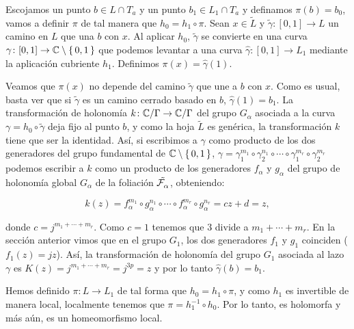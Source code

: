 Escojamos un punto $b\in L\cap T_{a}$ y un punto $b_{1}\in L_{1}\cap T_{a}$ y definamos $\pi(b)=b_{0}$, vamos a definir $\pi$ de tal manera que $h_{0}=h_{1}\circ\pi$. Sean $x\in\tilde{L}$ y $\tilde{\gamma}\colon [0,1]\rightarrow L$ un camino en $L$ que una $b$ con $x$. Al aplicar $h_{0}$, $\tilde{\gamma}$ se convierte en una curva $\gamma\colon [0,1]\rightarrow\mathbb{C}\setminus\{\, 0,1\, \}$ que podemos levantar a una curva $\hat{\gamma}\colon [0,1]\rightarrow  L_{1}$ mediante la aplicación cubriente $h_{1}$. Definimos $\pi(x)=\hat{\gamma}(1)$.

Veamos que $\pi(x)$ no depende del camino $\tilde{\gamma}$ que une a $b$ con $x$. Como es usual, basta ver que si $\tilde{\gamma}$ es un camino cerrado basado en $b$, $\hat{\gamma}(1)=b_{1}$. La transformación de holonomía $k\colon\mathbb{C}/\Gamma\rightarrow\mathbb{C}/\Gamma$ del grupo $G_{\alpha}$ asociada a la curva $\gamma=h_{0}\circ\tilde{\gamma}$ deja fijo al punto $b$, y como la hoja $\tilde{L}$ es genérica, la transformación $k$ tiene que ser la identidad. Así, si escribimos a $\gamma$ como producto de los dos generadores del grupo fundamental de $\mathbb{C}\setminus\{\, 0,1\, \}$, $\gamma=\gamma_{1}^{m_{1}}\circ\gamma_{2}^{n_{1}}\circ\cdots\circ\gamma_{1}^{m_{r}}\circ\gamma_{2}^{m_{r}}$ podemos escribir a $k$ como un producto de los generadores $f_{\alpha}$ y $g_{\alpha}$ del grupo de holonomía global $G_{\alpha}$ de la foliación $\tilde{\mathcal{F}^{\ }_{\alpha}}$, obteniendo:

$$k(z)=f_{\alpha}^{m_{1}}\circ g_{\alpha}^{n_{1}}\circ\cdots\circ f_{\alpha}^{m_{r}}\circ g_{\alpha}^{n_{r}}=cz+d=z,$$

\noindent donde $c=j^{m_{1}+\cdots+m_{r}}$. Como $c=1$ tenemos que $3$ divide a $m_{1}+\cdots+m_{r}$. En la sección anterior vimos que en el grupo $G_{1}$, los dos generadores $f_{1}$ y $g_{1}$ coinciden ($f_{1}(z)=jz$). Así, la transformación de holonomía del grupo $G_{1}$ asociada al lazo $\gamma$ es $K(z)=j^{m_{1}+\cdots+m_{r}}=j^{3p}=z$ y por lo tanto $\hat{\gamma}(b)=b_{1}$.

Hemos definido $\pi\colon L\rightarrow L_{1}$ de tal forma que $h_{0}=h_{1}\circ\pi$, y como $h_{1}$ es invertible de manera local, localmente tenemos que $\pi=h_{1}^{-1}\circ h_{0}$. Por lo tanto, es holomorfa y más aún, es un homeomorfismo local.\\

